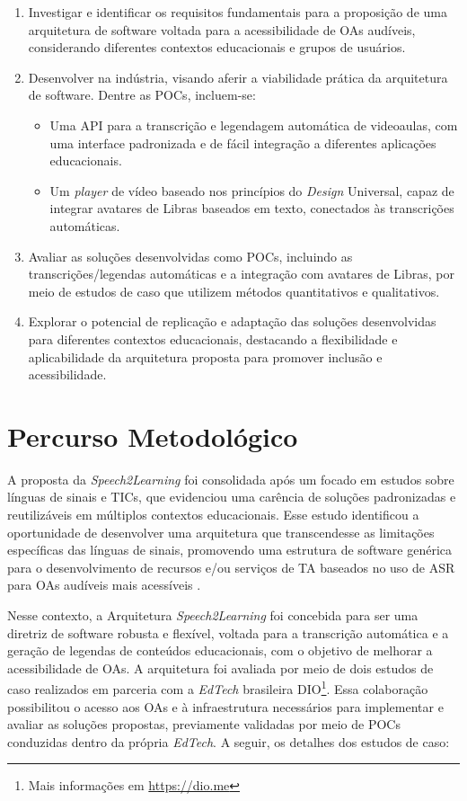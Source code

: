\begin{enumerate}
\item Investigar e identificar os requisitos fundamentais para a proposição de uma arquitetura de software voltada para a acessibilidade de OAs audíveis, considerando diferentes contextos educacionais e grupos de usuários.
\item Desenvolver  na indústria, visando aferir a viabilidade prática da arquitetura de software. Dentre as POCs, incluem-se:
\begin{itemize}
\item Uma API para a transcrição e legendagem automática de videoaulas, com uma interface padronizada e de fácil integração a diferentes aplicações educacionais.
\item Um \textit{player} de vídeo baseado nos princípios do \textit{Design} Universal, capaz de integrar avatares de Libras baseados em texto, conectados às transcrições automáticas.
\end{itemize}
\item Avaliar as soluções desenvolvidas como POCs, incluindo as transcrições/legendas automáticas e a integração com avatares de Libras, por meio de estudos de caso que utilizem métodos quantitativos e qualitativos.
\item Explorar o potencial de replicação e adaptação das soluções desenvolvidas para diferentes contextos educacionais, destacando a flexibilidade e aplicabilidade da arquitetura proposta para promover inclusão e acessibilidade.
\end{enumerate}

\section{Percurso Metodológico}

A proposta da \textit{Speech2Learning} foi consolidada após um  focado em estudos sobre línguas de sinais e TICs, que evidenciou uma carência de soluções padronizadas e reutilizáveis em múltiplos contextos educacionais. Esse estudo identificou a oportunidade de desenvolver uma arquitetura que transcendesse as limitações específicas das línguas de sinais, promovendo uma estrutura de software genérica para o desenvolvimento de recursos e/ou serviços de TA baseados no uso de ASR para OAs audíveis mais acessíveis \cite{FalvoJr2020_FIE, FalvoJr2020_SBIE, FalvoJr2021_RENOTE}.

Nesse contexto, a Arquitetura \textit{Speech2Learning} foi concebida para ser uma diretriz de software robusta e flexível, voltada para a transcrição automática e a geração de legendas de conteúdos educacionais, com o objetivo de melhorar a acessibilidade de OAs. A arquitetura foi avaliada por meio de dois estudos de caso realizados em parceria com a \textit{EdTech} brasileira DIO\footnote{Mais informações em \url{https://dio.me}}. Essa colaboração possibilitou o acesso aos OAs e à infraestrutura necessários para implementar e avaliar as soluções propostas, previamente validadas por meio de POCs conduzidas dentro da própria \textit{EdTech}. A seguir, os detalhes dos estudos de caso:

